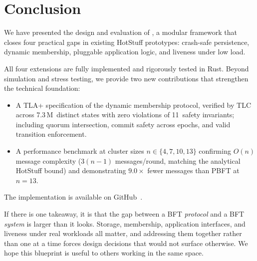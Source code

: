 \chapter{Conclusion}
\label{sec:conclusion}

We have presented the design and evaluation of \persisthotstuff{}, a modular framework that
closes four practical gaps in existing HotStuff prototypes: crash-safe persistence, dynamic
membership, pluggable application logic, and liveness under low load.

All four extensions are fully implemented and rigorously tested in Rust.  Beyond simulation
and stress testing, we provide two new contributions that strengthen the technical
foundation:

\begin{itemize}[itemsep=2pt]
  \item A TLA+ specification of the dynamic membership protocol, verified by TLC across
    7.3\,M~distinct states with zero violations of 11~safety invariants; including quorum
    intersection, commit safety across epochs, and valid transition enforcement.
  \item A performance benchmark at cluster sizes $n \in \{4, 7, 10, 13\}$ confirming $O(n)$
    message complexity ($3(n{-}1)$ messages/round, matching the analytical HotStuff bound)
    and demonstrating $9.0\times$ fewer messages than PBFT at $n{=}13$.
\end{itemize}

The implementation is available on GitHub~\cite{rust-implementation}.

If there is one takeaway, it is that the gap between a BFT \emph{protocol} and a BFT
\emph{system} is larger than it looks.  Storage, membership, application interfaces, and
liveness under real workloads all matter, and addressing them together rather than one at a
time forces design decisions that would not surface otherwise.  We hope this blueprint is
useful to others working in the same space.
